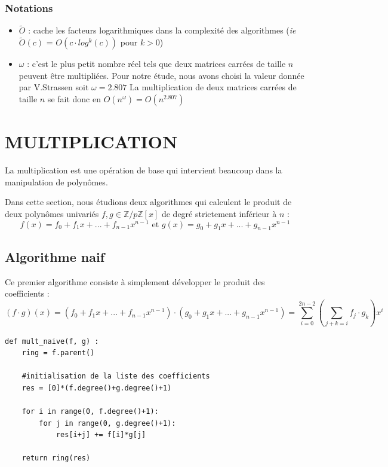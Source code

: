 \documentclass[a4paper]{article}
\begin{document}
\subsubsection*{Notations}
\begin{itemize}
\item $\tilde{O}$ : cache les facteurs logarithmiques dans la complexité des algorithmes (\textit{ie} $\tilde{O}(c)$ = $O(c\cdot log^{k}(c))$ pour $k>0$)
\item $\omega$ : c'est le plus petit nombre réel tels que deux matrices carrées de taille $n$ peuvent être multipliées. Pour notre étude, nous avons choisi la valeur donnée par V.Strassen soit $\omega=2.807$
La multiplication de deux matrices carrées de taille $n$ se fait donc en $O(n^\omega)=O(n^{2.807})$
\end{itemize}


\section{MULTIPLICATION}

La multiplication est une opération de base qui intervient beaucoup dans la manipulation de polynômes.

Dans cette section, nous étudions deux algorithmes qui calculent le produit de deux polynômes univariés $f,g \in \mathbb{Z}/p\mathbb{Z}[x]$ de degré strictement inférieur à $n$ :
\[
f(x)=f_0+f_1x+...+f_{n-1}x^{n-1}\text{ et }g(x)=g_0+g_1x+...+g_{n-1}x^{n-1}
\]

\subsection{Algorithme naif}

Ce premier algorithme consiste à simplement développer le produit des coefficients :
\[
(f\cdot g)(x)=(f_0+f_1x+...+f_{n-1}x^{n-1})\cdot (g_0+g_1x+...+g_{n-1}x^{n-1})=\sum_{i=0}^{2n-2} (\sum_{j+k=i}f_j\cdot g_k) x^i
\]

\begin{lstlisting}[title={multiplication naive}]
    def mult_naive(f, g) :
    ring = f.parent()

    #initialisation de la liste des coefficients
    res = [0]*(f.degree()+g.degree()+1) 
    
    for i in range(0, f.degree()+1):
        for j in range(0, g.degree()+1):
            res[i+j] += f[i]*g[j]

    return ring(res) 
\end{lstlisting}
\end{document}
